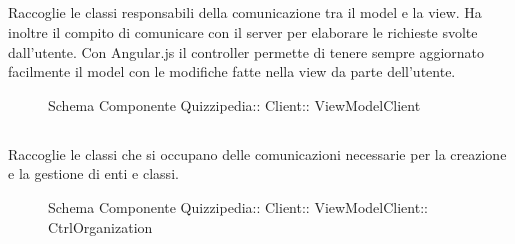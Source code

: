 \subsection{}
Raccoglie le classi responsabili della comunicazione tra il model e la view. Ha inoltre il compito di comunicare con il server per elaborare le richieste svolte dall'utente.
Con Angular.js il controller permette di tenere sempre aggiornato facilmente il model con le modifiche fatte nella view da parte dell'utente.
\begin{figure}[H]
\centering
\noindent{}
\caption[Schema Componente ViewModelClient]{Schema Componente Quizzipedia:: Client:: ViewModelClient}
\end{figure}
\subsection{}
Raccoglie le classi che si occupano delle comunicazioni necessarie per la creazione e la gestione di enti e classi.
\begin{figure}[H]
\centering
\noindent{}
\caption[Schema Componente CtrlOrganization]{Schema Componente Quizzipedia:: Client:: ViewModelClient:: CtrlOrganization}
\end{figure}
